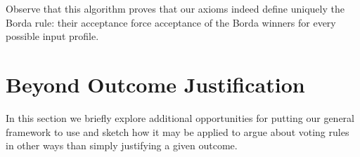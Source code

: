 \documentclass{comsoc2016}
\begin{document}
Observe that this algorithm proves that our axioms indeed define uniquely the Borda rule: their acceptance force acceptance of the Borda winners for every possible input profile.




\section{Beyond Outcome Justification}\label{sec:argumentation}

In this section we briefly explore additional opportunities for putting our general framework to use and sketch how it may be applied to argue about voting rules in other ways than simply justifying a given outcome.
\end{document}
